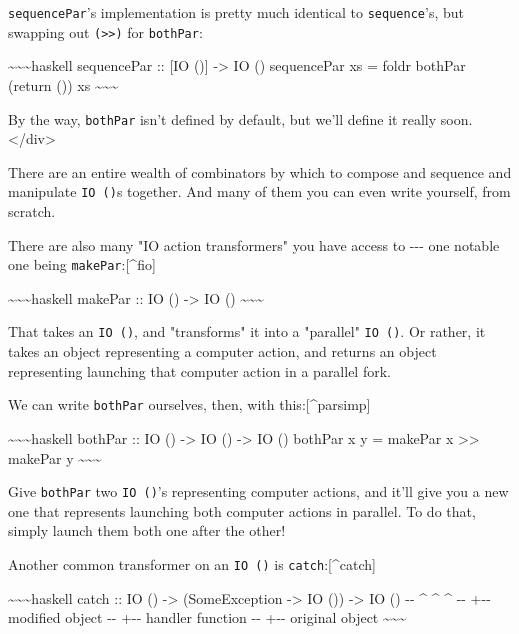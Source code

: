 \documentclass[]{article}
\begin{document}
\texttt{sequencePar}'s implementation is pretty much identical to
\texttt{sequence}'s, but swapping out \texttt{(\textgreater{}\textgreater{})}
for \texttt{bothPar}:

\textasciitilde{}\textasciitilde{}\textasciitilde{}haskell sequencePar :: {[}IO
(){]} -\textgreater{} IO () sequencePar xs = foldr bothPar (return ()) xs
\textasciitilde{}\textasciitilde{}\textasciitilde{}

By the way, \texttt{bothPar} isn't defined by default, but we'll define it
really soon. \textless{}/div\textgreater{}

There are an entire wealth of combinators by which to compose and sequence and
manipulate \texttt{IO\ ()}s together. And many of them you can even write
yourself, from scratch.

There are also many "IO action transformers" you have access to -\/-\/- one
notable one being \texttt{makePar}:{[}\^{}fio{]}

\textasciitilde{}\textasciitilde{}\textasciitilde{}haskell makePar :: IO ()
-\textgreater{} IO () \textasciitilde{}\textasciitilde{}\textasciitilde{}

That takes an \texttt{IO\ ()}, and "transforms" it into a "parallel"
\texttt{IO\ ()}. Or rather, it takes an object representing a computer action,
and returns an object representing launching that computer action in a parallel
fork.

We can write \texttt{bothPar} ourselves, then, with this:{[}\^{}parsimp{]}

\textasciitilde{}\textasciitilde{}\textasciitilde{}haskell bothPar :: IO ()
-\textgreater{} IO () -\textgreater{} IO () bothPar x y = makePar x
\textgreater{}\textgreater{} makePar y
\textasciitilde{}\textasciitilde{}\textasciitilde{}

Give \texttt{bothPar} two \texttt{IO\ ()}'s representing computer actions, and
it'll give you a new one that represents launching both computer actions in
parallel. To do that, simply launch them both one after the other!

Another common transformer on an \texttt{IO\ ()} is
\texttt{catch}:{[}\^{}catch{]}

\textasciitilde{}\textasciitilde{}\textasciitilde{}haskell catch :: IO ()
-\textgreater{} (SomeException -\textgreater{} IO ()) -\textgreater{} IO () -\/-
\^{} \^{} \^{} -\/- \textbar{} \textbar{} +-\/- modified object -\/- \textbar{}
+-\/- handler function -\/- +-\/- original object
\textasciitilde{}\textasciitilde{}\textasciitilde{}
\end{document}
